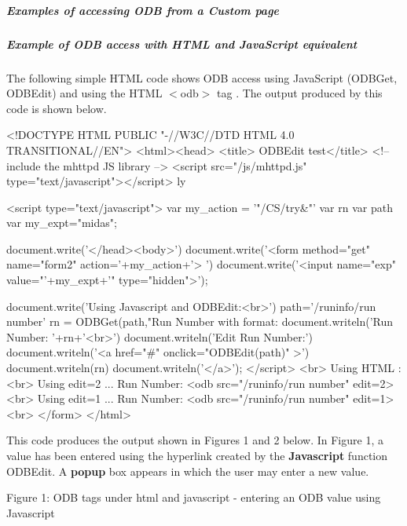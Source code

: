 \par
 \label{index_end}
\hypertarget{index_end}{}




\par
 \subparagraph{Examples of accessing ODB from a Custom page}\label{RC_mhttpd_custom_ODB_access_examples}
\par




\par
 \hypertarget{RC_mhttpd_custom_ODB_access_examples_RC_mhttpd_js_example1}{}\subparagraph{Example of ODB access with HTML and JavaScript equivalent}\label{RC_mhttpd_custom_ODB_access_examples_RC_mhttpd_js_example1}
The following simple HTML code shows ODB access using JavaScript (ODBGet, ODBEdit) and using the HTML  $<$odb$>$ tag . The output produced by this code is shown below. 
\begin{DoxyCode}
<!DOCTYPE HTML PUBLIC "-//W3C//DTD HTML 4.0 TRANSITIONAL//EN">
<html><head>
<title> ODBEdit test</title>
<!-- include the mhttpd JS library -->
\htmlonly <script src="/js/mhttpd.js" type="text/javascript"></script> \endhtmlon
      ly

\htmlonly <script type="text/javascript">
var my_action = '"/CS/try&"'
var rn
var path
var my_expt="midas";

document.write('</head><body>')
document.write('<form method="get" name="form2" action='+my_action+'> ')
document.write('<input name="exp" value="'+my_expt+'" type="hidden">');

document.write('Using Javascript and ODBEdit:<br>')
path='/runinfo/run number'
rn = ODBGet(path,"Run Number with format: %
document.writeln('Run Number: '+rn+'<br>')
document.writeln('Edit Run Number:')
document.writeln('<a href="#" onclick="ODBEdit(path)" >')
document.writeln(rn)
document.writeln('</a>');
</script> \endhtmlonly
<br>
Using HTML :
<br>
Using edit=2 ...  Run Number:
<odb src="/runinfo/run number" edit=2>
<br>
Using edit=1 ...  Run Number:
<odb src="/runinfo/run number" edit=1>
<br>
</form>
</html>
\end{DoxyCode}
 \par


This code produces the output shown in Figures 1 and 2 below. In Figure 1, a value has been entered using the hyperlink created by the {\bfseries Javascript} function ODBEdit. A {\bfseries popup} box appears in which the user may enter a new value.

\par
\par
\par
 \begin{center} Figure 1: ODB tags under html and javascript -\/ entering an ODB value using Javascript \par
\par
\par
  \end{center}  \par
\par
\par


